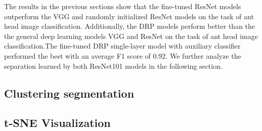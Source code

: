 \documentclass{aci}
\numberwithin{equation}{section}
\begin{document}
\FloatBarrier
The results in the previous sections show that the fine-tuned ResNet models
outperform the VGG and randomly initialized ResNet models on the task of ant
head image classification. Additionally, the DRP models perform better than the
the general deep learning models VGG and ResNet on the task of ant head image
classification.The fine-tuned DRP single-layer model with auxiliary classifier
performed the best with an average F1 score of 0.92. We further analyze the
separation learned by both ResNet101 models in the following section.


\subsection{Clustering segmentation}

\subsection{t-SNE Visualization}
\end{document}
